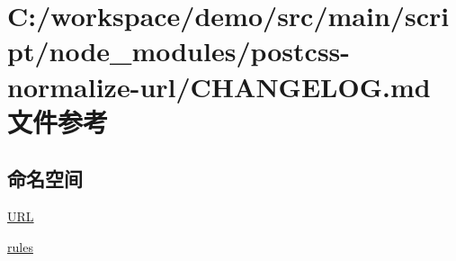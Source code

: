 \hypertarget{postcss-normalize-url_2_c_h_a_n_g_e_l_o_g_8md}{}\section{C\+:/workspace/demo/src/main/script/node\+\_\+modules/postcss-\/normalize-\/url/\+C\+H\+A\+N\+G\+E\+L\+OG.md 文件参考}
\label{postcss-normalize-url_2_c_h_a_n_g_e_l_o_g_8md}
\subsection*{命名空间}
\begin{DoxyCompactItemize}
\item 
 \mbox{\hyperlink{namespace_u_r_l}{U\+RL}}
\item 
 \mbox{\hyperlink{namespacerules}{rules}}
\end{DoxyCompactItemize}
